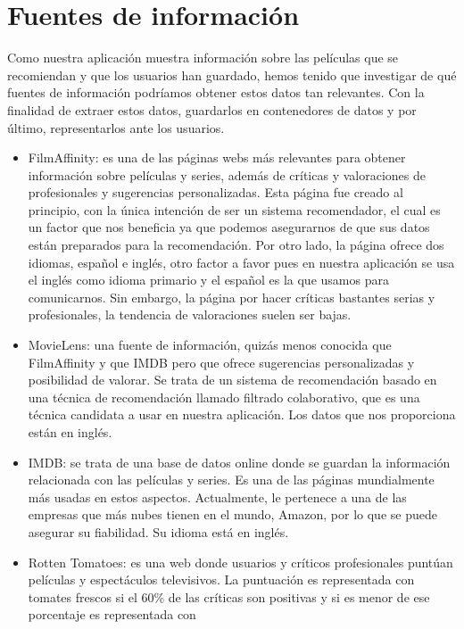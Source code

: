 \section{Fuentes de información}
\label{makereference2.2}
Como nuestra aplicación muestra información sobre las películas que se recomiendan y que los usuarios han guardado, hemos
tenido que investigar de qué fuentes de información podríamos obtener estos datos tan relevantes. Con la finalidad de extraer
estos datos, guardarlos en contenedores de datos y por último, representarlos ante los usuarios.
\begin{itemize}
    \item FilmAffinity\cite{filmaffinity}: es una de las páginas webs más relevantes para obtener información sobre películas y series, además de críticas y valoraciones de profesionales y sugerencias personalizadas.
    Esta página fue creado al principio, con la única intención de ser un sistema recomendador, el cual es un factor que nos beneficia ya que podemos asegurarnos de que sus datos están preparados para la recomendación.
    Por otro lado, la página ofrece dos idiomas, español e inglés, otro factor a favor pues en nuestra aplicación se usa el inglés como idioma primario y el español es la que usamos para comunicarnos. Sin embargo, la página por 
    hacer críticas bastantes serias y profesionales, la tendencia de valoraciones suelen ser bajas.
    \item MovieLens\cite{movielens}: una fuente de información, quizás menos conocida que FilmAffinity y que IMDB pero que ofrece sugerencias personalizadas y posibilidad de valorar. Se trata de un sistema de recomendación basado en una técnica de recomendación 
    llamado filtrado colaborativo\cite{filtradocolaborativo}, que es una técnica candidata a usar en nuestra aplicación. Los datos que nos proporciona están en inglés.
    \item IMDB\cite{imdb}: se trata de una base de datos online donde se guardan la información relacionada con las películas y series. Es una de las páginas mundialmente más usadas en estos aspectos.
    Actualmente, le pertenece a una de las empresas que más nubes tienen en el mundo, Amazon, por lo que se puede asegurar su fiabilidad. Su idioma está en inglés.
    \item Rotten Tomatoes\cite{rottentomatoes}: es una web donde usuarios y
     críticos profesionales puntúan películas y espectáculos televisivos.
    La puntuación es representada con tomates frescos si el 60\% de las
     críticas son positivas y si es menor de ese porcentaje es representada con

\end{itemize}
